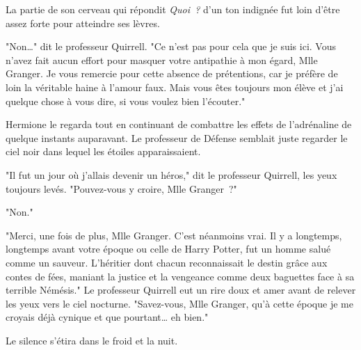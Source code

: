 La partie de son cerveau qui répondit \emph{Quoi~?} d'un ton indignée fut loin d'être assez forte pour atteindre ses lèvres.

"Non…" dit le professeur Quirrell. "Ce n'est pas pour cela que je suis ici. Vous n'avez fait aucun effort pour masquer votre antipathie à mon égard, Mlle Granger. Je vous remercie pour cette absence de prétentions, car je préfère de loin la véritable haine à l'amour faux. Mais vous êtes toujours mon élève et j'ai quelque chose à vous dire, si vous voulez bien l'écouter."

Hermione le regarda tout en continuant de combattre les effets de l'adrénaline de quelque instants auparavant. Le professeur de Défense semblait juste regarder le ciel noir dans lequel les étoiles apparaissaient.

"Il fut un jour où j'allais devenir un héros," dit le professeur Quirrell, les yeux toujours levés. "Pouvez-vous y croire, Mlle Granger~?"

"Non."

"Merci, une fois de plus, Mlle Granger. C'est néanmoins vrai. Il y a longtemps, longtemps avant votre époque ou celle de Harry Potter, fut un homme salué comme un sauveur. L'héritier dont chacun reconnaissait le destin grâce aux contes de fées, maniant la justice et la vengeance comme deux baguettes face à sa terrible Némésis." Le professeur Quirrell eut un rire doux et amer avant de relever les yeux vers le ciel nocturne. "Savez-vous, Mlle Granger, qu'à cette époque je me croyais déjà cynique et que pourtant… eh bien."

Le silence s'étira dans le froid et la nuit.

